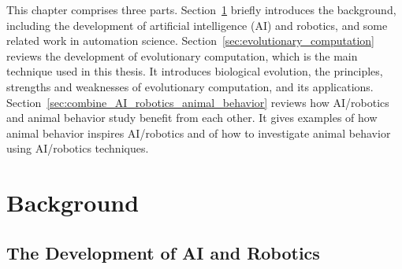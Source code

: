 This chapter comprises three parts. Section~\ref{sec:background} briefly introduces the background, including the development of artificial intelligence (AI) and robotics, and some related work in automation science. Section~\ref{sec:evolutionary_computation} reviews the development of evolutionary computation,  which is the main technique used in this thesis. It introduces biological evolution, the principles, strengths and weaknesses of evolutionary computation, and its applications. Section~\ref{sec:combine_AI_robotics_animal_behavior} reviews how AI/robotics and animal behavior study benefit from each other. It gives examples of how animal behavior inspires AI/robotics and of how to investigate animal behavior using AI/robotics techniques.  

\section{Background}\label{sec:background}

\subsection{The Development of AI and Robotics}\label{sec:development_of_AI_Robotics}

